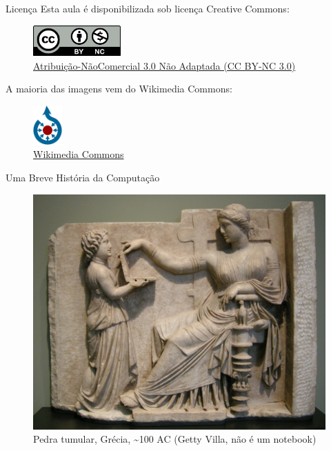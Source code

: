 \documentclass[10pt, compress, aspectratio=169, xcolor={table,usenames,dvipsnames}]{beamer}
\begin{document}
\begin{frame}[label={sec:org962b105}]{Licença}
Esta aula é disponibilizada sob \alert{licença Creative Commons}:
\begin{figure}[htbp]
\centering
\includegraphics[width=0.3\textwidth]{../../../img/by-nc.png}
\caption{\href{https://creativecommons.org/licenses/by-nc/3.0/deed.pt}{Atribuição-NãoComercial 3.0 Não Adaptada (CC BY-NC 3.0)}}
\end{figure}

A maioria das imagens vem do \alert{Wikimedia Commons}:
\begin{figure}[htbp]
\centering
\includegraphics[width=0.1\textwidth]{../../../img/wikimedia_commons.jpg}
\caption{\href{https://commons.wikimedia.org/wiki/Main_Page}{Wikimedia Commons}}
\end{figure}
\end{frame}
\begin{frame}[label={sec:org85def95}]{Uma Breve História da Computação}
\begin{figure}[htbp]
\centering
\includegraphics[height=.8\textheight]{../../../img/computador_grego.jpg}
\caption{Pedra tumular, Grécia, \textasciitilde{100 AC} (Getty Villa, \alert{não é um notebook})}
\end{figure}
\end{frame}
\end{document}
